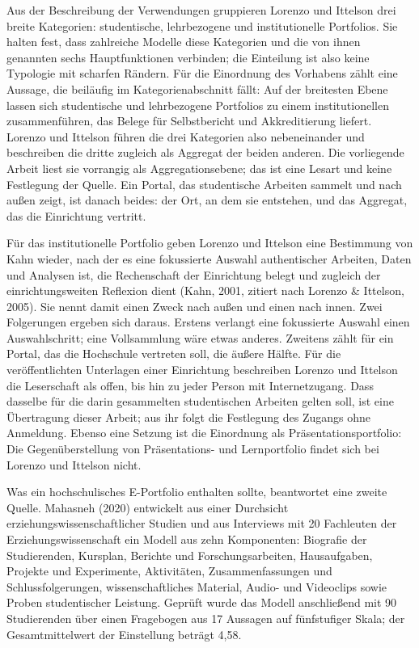 Aus der Beschreibung der Verwendungen gruppieren Lorenzo und Ittelson drei breite Kategorien: studentische, lehrbezogene und institutionelle Portfolios. Sie halten fest, dass zahlreiche Modelle diese Kategorien und die von ihnen genannten sechs Hauptfunktionen verbinden; die Einteilung ist also keine Typologie mit scharfen Rändern. Für die Einordnung des Vorhabens zählt eine Aussage, die beiläufig im Kategorienabschnitt fällt: Auf der breitesten Ebene lassen sich studentische und lehrbezogene Portfolios zu einem institutionellen zusammenführen, das Belege für Selbstbericht und Akkreditierung liefert. Lorenzo und Ittelson führen die drei Kategorien also nebeneinander und beschreiben die dritte zugleich als Aggregat der beiden anderen. Die vorliegende Arbeit liest sie vorrangig als Aggregationsebene; das ist eine Lesart und keine Festlegung der Quelle. Ein Portal, das studentische Arbeiten sammelt und nach außen zeigt, ist danach beides: der Ort, an dem sie entstehen, und das Aggregat, das die Einrichtung vertritt.

Für das institutionelle Portfolio geben Lorenzo und Ittelson eine Bestimmung von Kahn wieder, nach der es eine fokussierte Auswahl authentischer Arbeiten, Daten und Analysen ist, die Rechenschaft der Einrichtung belegt und zugleich der einrichtungsweiten Reflexion dient (Kahn, 2001, zitiert nach Lorenzo \& Ittelson, 2005). Sie nennt damit einen Zweck nach außen und einen nach innen. Zwei Folgerungen ergeben sich daraus. Erstens verlangt eine fokussierte Auswahl einen Auswahlschritt; eine Vollsammlung wäre etwas anderes. Zweitens zählt für ein Portal, das die Hochschule vertreten soll, die äußere Hälfte. Für die veröffentlichten Unterlagen einer Einrichtung beschreiben Lorenzo und Ittelson die Leserschaft als offen, bis hin zu jeder Person mit Internetzugang. Dass dasselbe für die darin gesammelten studentischen Arbeiten gelten soll, ist eine Übertragung dieser Arbeit; aus ihr folgt die Festlegung des Zugangs ohne Anmeldung. Ebenso eine Setzung ist die Einordnung als Präsentationsportfolio: Die Gegenüberstellung von Präsentations- und Lernportfolio findet sich bei Lorenzo und Ittelson nicht.

Was ein hochschulisches E-Portfolio enthalten sollte, beantwortet eine zweite Quelle. Mahasneh (2020) entwickelt aus einer Durchsicht erziehungswissenschaftlicher Studien und aus Interviews mit 20 Fachleuten der Erziehungswissenschaft ein Modell aus zehn Komponenten: Biografie der Studierenden, Kursplan, Berichte und Forschungsarbeiten, Hausaufgaben, Projekte und Experimente, Aktivitäten, Zusammenfassungen und Schlussfolgerungen, wissenschaftliches Material, Audio- und Videoclips sowie Proben studentischer Leistung. Geprüft wurde das Modell anschließend mit 90 Studierenden über einen Fragebogen aus 17 Aussagen auf fünfstufiger Skala; der Gesamtmittelwert der Einstellung beträgt 4,58.

